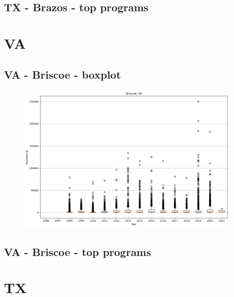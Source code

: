 \subsection*{TX - Brazos - top programs}

\newpage
\section*{VA}
\subsection*{VA - Briscoe - boxplot}
\begin{figure}[h]
\centering
\includegraphics[width=7in]{../output/boxplots/counties/Briscoe-VA_boxplot.png}
\end{figure}


\subsection*{VA - Briscoe - top programs}

\newpage
\section*{TX}
